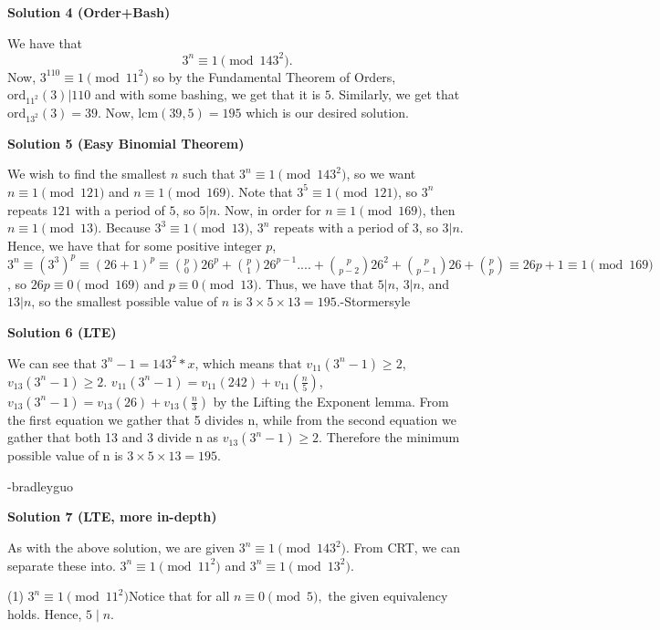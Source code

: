 \begin{enumerate}
 



\textbf{Solution 4 (Order+Bash)}

We have that 
 \[3^n \equiv 1 \pmod{143^2}.\]Now, $3^{110} \equiv 1 \pmod{11^2}$ so by the Fundamental Theorem of Orders, $\text{ord}_{11^2}(3)|110$ and with some bashing, we get that it is $5$. Similarly, we get that $\text{ord}_{13^2}(3)=39$. Now, $\text{lcm}(39,5)=\boxed{195}$ which is our desired solution.

 



\textbf{Solution 5 (Easy Binomial Theorem)}

We wish to find the smallest $n$ such that $3^n\equiv 1\pmod{143^2}$, so we want $n\equiv 1\pmod{121}$ and $n\equiv 1\pmod{169}$. Note that $3^5\equiv 1\pmod{121}$,  so $3^n$ repeats $121$ with a period of $5$, so $5|n$. Now, in order for $n\equiv 1\pmod{169}$, then $n\equiv 1\pmod{13}$. Because $3^3\equiv 1\pmod{13}$, $3^n$ repeats with a period of $3$, so $3|n$. Hence, we have that for some positive integer $p$, $3^n\equiv (3^3)^p\equiv (26+1)^p\equiv \binom{p}{0}26^p+\binom{p}{1}26^{p-1}....+\binom{p}{p-2}26^2+\binom{p}{p-1}26+\binom{p}{p}\equiv 26p+1\equiv 1\pmod{169}$, so $26p\equiv 0\pmod{169}$ and $p\equiv 0\pmod{13}$. Thus, we have that $5|n$, $3|n$, and $13|n$, so the smallest possible value of $n$ is $3\times5\times13=\boxed{195}$.-Stormersyle

 



\textbf{Solution 6 (LTE)}

We can see that $3^n-1 = 143^2*x$, which means that $v_{11}(3^n-1) \geq 2$, $v_{13}(3^n-1) \geq 2$. $v_{11}(3^n-1) = v_{11}(242) + v_{11}(\frac{n}{5})$, $v_{13}(3^n-1) = v_{13}(26) + v_{13}(\frac{n}{3})$ by the Lifting the Exponent lemma. From the first equation we gather that 5 divides n, while from the second equation we gather that both 13 and 3 divide n as $v_{13}(3^n-1) \geq 2$. Therefore the minimum possible value of n is $3\times5\times13=\boxed{195}$.

 -bradleyguo

 



\textbf{Solution 7 (LTE, more in-depth)}

As with the above solution, we are given $3^n \equiv 1 \pmod {143^2}.$ From CRT, we can separate these into. $3^n \equiv 1 \pmod {11^2}$ and $3^n \equiv 1 \pmod {13^2}.$

 (1) $3^n \equiv 1 \pmod {11^2}$Notice that for all $n \equiv 0 \pmod 5,$ the given equivalency holds. Hence, $5 \mid n.$


\end{enumerate}
